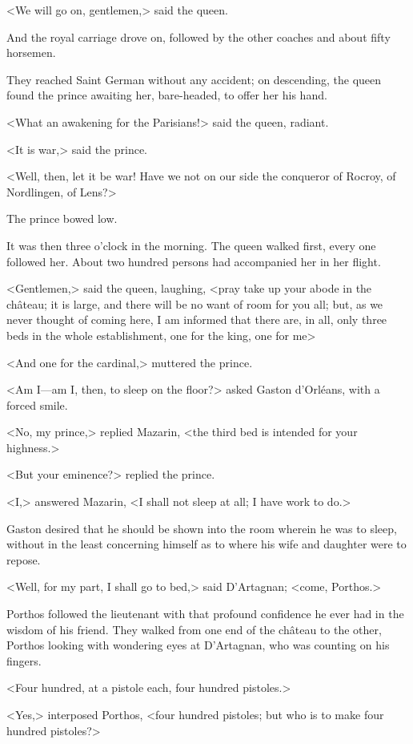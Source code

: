 <We will go on, gentlemen,> said the queen.

And the royal carriage drove on, followed by the other coaches and about fifty horsemen.

They reached Saint German without any accident; on descending, the queen found the prince awaiting her, bare-headed, to offer her his hand.

<What an awakening for the Parisians!> said the queen, radiant.

<It is war,> said the prince.

<Well, then, let it be war! Have we not on our side the conqueror of Rocroy, of Nordlingen, of Lens?>

The prince bowed low.

It was then three o'clock in the morning. The queen walked first, every one followed her. About two hundred persons had accompanied her in her flight.

<Gentlemen,> said the queen, laughing, <pray take up your abode in the château; it is large, and there will be no want of room for you all; but, as we never thought of coming here, I am informed that there are, in all, only three beds in the whole establishment, one for the king, one for me\longdash>

<And one for the cardinal,> muttered the prince.

<Am I—am I, then, to sleep on the floor?> asked Gaston d'Orléans, with a forced smile.

<No, my prince,> replied Mazarin, <the third bed is intended for your highness.>

<But your eminence?> replied the prince.

<I,> answered Mazarin, <I shall not sleep at all; I have work to do.>

Gaston desired that he should be shown into the room wherein he was to sleep, without in the least concerning himself as to where his wife and daughter were to repose.

<Well, for my part, I shall go to bed,> said D'Artagnan; <come, Porthos.>

Porthos followed the lieutenant with that profound confidence he ever had in the wisdom of his friend. They walked from one end of the château to the other, Porthos looking with wondering eyes at D'Artagnan, who was counting on his fingers.

<Four hundred, at a pistole each, four hundred pistoles.>

<Yes,> interposed Porthos, <four hundred pistoles; but who is to make four hundred pistoles?>

